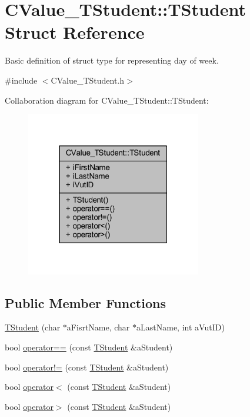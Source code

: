 \hypertarget{struct_c_value___t_student_1_1_t_student}{}\section{C\+Value\+\_\+\+T\+Student\+:\+:T\+Student Struct Reference}
\label{struct_c_value___t_student_1_1_t_student}


Basic definition of struct type for representing day of week.  




{\ttfamily \#include $<$C\+Value\+\_\+\+T\+Student.\+h$>$}



Collaboration diagram for C\+Value\+\_\+\+T\+Student\+:\+:T\+Student\+:\nopagebreak
\begin{figure}[H]
\begin{center}
\leavevmode
\includegraphics[width=217pt]{struct_c_value___t_student_1_1_t_student__coll__graph}
\end{center}
\end{figure}
\subsection*{Public Member Functions}
\begin{DoxyCompactItemize}
\item 
\hyperlink{struct_c_value___t_student_1_1_t_student_ae052eac687165ae925ca2a15bccc9d95}{T\+Student} (char $\ast$a\+Fisrt\+Name, char $\ast$a\+Last\+Name, int a\+Vut\+ID)
\item 
bool \hyperlink{struct_c_value___t_student_1_1_t_student_ac12071cfbbb72f3666833d7da227f052}{operator==} (const \hyperlink{struct_c_value___t_student_1_1_t_student}{T\+Student} \&a\+Student)
\item 
bool \hyperlink{struct_c_value___t_student_1_1_t_student_aaadc7d5525e434de77c6874052174903}{operator!=} (const \hyperlink{struct_c_value___t_student_1_1_t_student}{T\+Student} \&a\+Student)
\item 
bool \hyperlink{struct_c_value___t_student_1_1_t_student_a0e70d174799ef62209bfd2719077f127}{operator$<$} (const \hyperlink{struct_c_value___t_student_1_1_t_student}{T\+Student} \&a\+Student)
\item 
bool \hyperlink{struct_c_value___t_student_1_1_t_student_ae31809572b52d475b4e891b2a4acaafd}{operator$>$} (const \hyperlink{struct_c_value___t_student_1_1_t_student}{T\+Student} \&a\+Student)
\end{DoxyCompactItemize}
